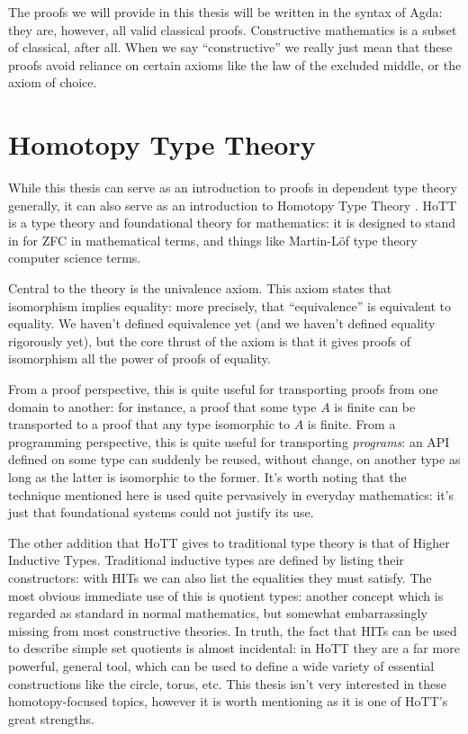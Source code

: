 The proofs we will provide in this thesis will be written in the syntax of
Agda: they are, however, all valid classical proofs.
Constructive mathematics is a subset of classical, after all.
When we say ``constructive'' we really just mean that these proofs avoid
reliance on certain axioms like the law of the excluded middle, or the axiom of
choice.
\section{Homotopy Type Theory}
While this thesis can serve as an introduction to proofs in dependent type
theory generally, it can also serve as an introduction to Homotopy Type Theory
\citep{hottbook}.
HoTT is a type theory and foundational theory for mathematics: it is designed to
stand in for ZFC in mathematical terms, and things like Martin-Löf type theory
computer science terms.

Central to the theory is the univalence axiom.
This axiom states that isomorphism implies equality: more precisely, that
``equivalence'' is equivalent to equality.
We haven't defined equivalence yet (and we haven't defined equality rigorously
yet), but the core thrust of the axiom is that it gives proofs of isomorphism
all the power of proofs of equality.

From a proof perspective, this is quite useful for transporting proofs from one
domain to another: for instance, a proof that some type \(A\) is finite can be
transported to a proof that any type isomorphic to \(A\) is finite.
From a programming perspective, this is quite useful for transporting
\emph{programs}: an API defined on some type can suddenly be reused, without
change, on another type as long as the latter is isomorphic to the former.
It's worth noting that the technique mentioned here is used quite
pervasively in everyday mathematics: it's just that foundational systems could
not justify its use.

The other addition that HoTT gives to traditional type theory is that of Higher
Inductive Types.
Traditional inductive types are defined by listing their constructors: with HITs
we can also list the equalities they must satisfy.
The most obvious immediate use of this is quotient types: another concept which
is regarded as standard in normal mathematics, but somewhat embarrassingly
missing from most constructive theories.
In truth, the fact that HITs can be used to describe simple set quotients is
almost incidental: in HoTT they are a far more powerful, general tool,
which can be used to define a wide variety of essential constructions like the
circle, torus, etc.
This thesis isn't very interested in these homotopy-focused topics, however it
is worth mentioning as it is one of HoTT's great strengths.

